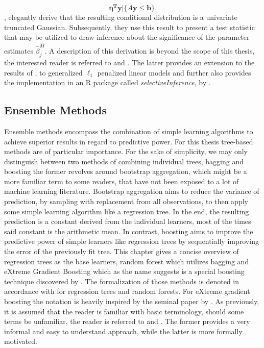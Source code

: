 \documentclass[a4paper,12pt, headsepline]{scrartcl}
\numberwithin{equation}{section}
\begin{document}
\[
\bm{\eta^Ty}|\{A\bm{y} \leq \bm{b}\}.
\]
\citet{Lee2016}, elegantly derive that the resulting conditional distribution is a univariate truncated Gaussian. Subsequently, they use this result to present a test statistic that may be utilized to draw inference about the significance of the parameter estimates $\hat\beta_j^{\hat M}$. A description of this derivation is beyond the scope of this thesis, the interested reader is referred to \citet{Lee2016} and \citet{tib2016}. The latter provides an extension to the results of \citet{Lee2016}, to generalized $\ell_1$ penalized linear models and further also provides the implementation in an R package called \textit{selectiveInference}, by \citet{selectiveInference}.

\subsection{Ensemble Methods}\label{subsec:ens}
Ensemble methods encompass the combination of simple learning algorithms to achieve superior results in regard to predictive power. For this thesis tree-based methods are of particular importance. For the sake of simplicity, we may only distinguish between two methods of combining individual trees, bagging and boosting the former revolves around bootstrap aggregation, which might be a more familiar term to some readers, that have not been exposed to a lot of machine learning literature. Bootstrap aggregation aims to reduce the variance of prediction, by sampling with replacement from all observations, to then apply some simple learning algorithm like a regression tree. In the end, the resulting prediction is a constant derived from the individual learners, most of the times said constant is the arithmetic mean. In contrast, boosting aims to improve the predictive power of simple learners like regression trees by sequentially improving the error of the previously fit tree. This chapter gives a concise overview of regression trees as the base learners, random forest which utilizes bagging and eXtreme Gradient Boosting which as the name suggests is a special boosting technique discovered by \citet{chen2016}. The formalization of those methods is denoted in accordance with \citet{hastie09} for regression trees and random forests. For eXtreme gradient boosting the notation is heavily inspired by the seminal paper by \citet{chen2016}. As previously, it is assumed that the reader is familiar with basic terminology, should some terms be unfamiliar, the reader is referred to \citet{James2013} and \citet{hastie09}. The former provides a very informal and easy to understand approach, while the latter is more formally motivated.
\end{document}
